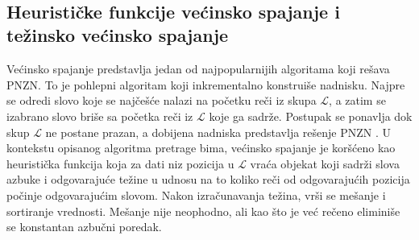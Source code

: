 \documentclass[12pt,oneside]{memoir}
\begin{document}
\\

\subsection{Heurističke funkcije većinsko spajanje i težinsko većinsko spajanje}
\label{sec:mmiwmm}
Većinsko spajanje predstavlja jedan od najpopularnijih algoritama koji rešava PNZN. To je pohlepni algoritam
koji inkrementalno konstruiše nadnisku. Najpre se odredi slovo koje se najčešće nalazi na početku reči
iz skupa $\mathcal{L}$, a zatim se izabrano slovo briše sa početka reči iz $\mathcal{L}$ koje ga sadrže.
Postupak se ponavlja dok skup $\mathcal{L}$ ne postane prazan, a dobijena nadniska
predstavlja rešenje PNZN \cite{ProbabilisticBS}.
U kontekstu opisanog algoritma pretrage bima, većinsko spajanje je koršćeno kao heuristička funkcija
koja za dati niz pozicija u $\mathcal{L}$ vraća objekat koji sadrži slova azbuke i odgovarajuće
težine u udnosu na to koliko reči od odgovarajućih pozicija počinje odgovarajućim slovom.
Nakon izračunavanja težina, vrši se mešanje i sortiranje vrednosti. Mešanje nije neophodno,
ali kao što je već rečeno eliminiše se konstantan azbučni poredak. 
\end{document}
